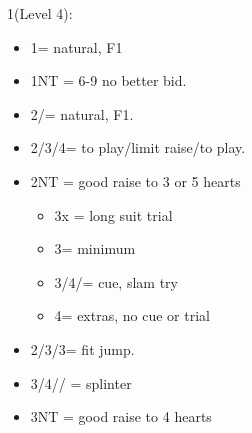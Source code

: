 \documentclass[a4paper,14pt]{extarticle}
\begin{document}
\begin{itemize}
{\color{CadetBlue}
\item 1\hearts (Level 4):
	\begin{itemize}
	\item 1\spades = natural, F1
   \item 1NT = 6-9 no better bid.
   \item 2\clubs/\diamonds = natural, F1.
   \item 2\hearts/3\hearts/4\hearts = to play/limit raise/to play.
   \item 2NT = good raise to 3 or 5 hearts
		\begin{itemize}
		\item 3x = long suit trial
		\item 3\hearts = minimum
		\item 3\spades/4\clubs/\diamonds = cue, slam try
		\item 4\hearts = extras, no cue or trial
		\end{itemize}
   \item 2\spades/3\clubs/3\diamonds = fit jump.
   \item 3\spades/4\clubs/\diamonds/ = splinter
\label{note:3}
	\item 3NT = good raise to 4 hearts
	\end{itemize}
}


\end{itemize}
\end{document}
